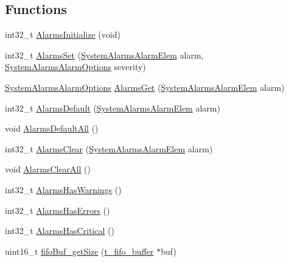 \subsection*{\-Functions}
\begin{DoxyCompactItemize}
\item 
int32\-\_\-t \hyperlink{group___tau_labs_libraries_gaa2707dbd32985c54ef5776147c4e0fc2}{\-Alarms\-Initialize} (void)
\item 
int32\-\_\-t \hyperlink{group___tau_labs_libraries_gadd1139478e7c6bc1b6afaaa0d1d114dd}{\-Alarms\-Set} (\hyperlink{group___system_alarms_ga00a6e22ba79966c55dc043860127ed4d}{\-System\-Alarms\-Alarm\-Elem} alarm, \hyperlink{group___system_alarms_ga3febc1d561b4dbb1a7b3676723285e50}{\-System\-Alarms\-Alarm\-Options} severity)
\item 
\hyperlink{group___system_alarms_ga3febc1d561b4dbb1a7b3676723285e50}{\-System\-Alarms\-Alarm\-Options} \hyperlink{group___tau_labs_libraries_gad166792501b216a64df3e1ec0017db04}{\-Alarms\-Get} (\hyperlink{group___system_alarms_ga00a6e22ba79966c55dc043860127ed4d}{\-System\-Alarms\-Alarm\-Elem} alarm)
\item 
int32\-\_\-t \hyperlink{group___tau_labs_libraries_gab3a5d632f443b5e8e914c13103d81e0e}{\-Alarms\-Default} (\hyperlink{group___system_alarms_ga00a6e22ba79966c55dc043860127ed4d}{\-System\-Alarms\-Alarm\-Elem} alarm)
\item 
void \hyperlink{group___tau_labs_libraries_ga9daaea9cc9394928db79c5d475b5e621}{\-Alarms\-Default\-All} ()
\item 
int32\-\_\-t \hyperlink{group___tau_labs_libraries_gafce7d51ebedc70de373224f839c77399}{\-Alarms\-Clear} (\hyperlink{group___system_alarms_ga00a6e22ba79966c55dc043860127ed4d}{\-System\-Alarms\-Alarm\-Elem} alarm)
\item 
void \hyperlink{group___tau_labs_libraries_ga9a68c7084ffef47a37ebf1a0284ecc41}{\-Alarms\-Clear\-All} ()
\item 
int32\-\_\-t \hyperlink{group___tau_labs_libraries_gaa6670051fe2fcab76f66b75a4331809f}{\-Alarms\-Has\-Warnings} ()
\item 
int32\-\_\-t \hyperlink{group___tau_labs_libraries_ga8793bd5e55481a40145e4f81bf052a99}{\-Alarms\-Has\-Errors} ()
\item 
int32\-\_\-t \hyperlink{group___tau_labs_libraries_ga0f241880ab969542907c4216fe85aa70}{\-Alarms\-Has\-Critical} ()
\item 
uint16\-\_\-t \hyperlink{group___tau_labs_libraries_gaa270e4285342d4acfa39da6f18d5660a}{fifo\-Buf\-\_\-get\-Size} (\hyperlink{structt__fifo__buffer}{t\-\_\-fifo\-\_\-buffer} $\ast$buf)

\end{DoxyCompactItemize}
